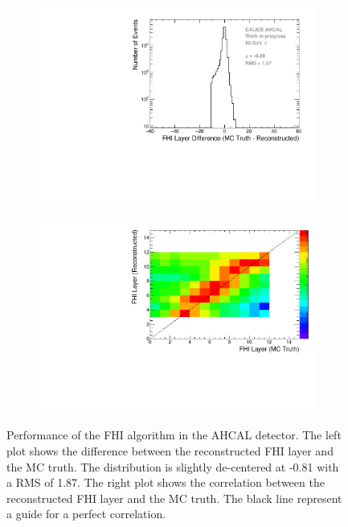 \begin{figure}[htbp!]
	\begin{subfigure}[t]{0.5\textwidth}
		\centering
		\includegraphics[width=1\textwidth]{../Thesis_Plots/Timing/Pions/Plots/ShowerStart_Difference_noOptimisation.pdf}
		\caption{}\label{fig:Diff_FHI_RecoMC}
	\end{subfigure}
	\hfill
	\begin{subfigure}[t]{0.5\textwidth}
		\centering
		\includegraphics[width=1\textwidth]{../Thesis_Plots/Timing/Pions/Plots/ShowerStart_Difference_noOptimisation_2D.pdf}
		\caption{}\label{fig:Corr_FHI_RecoMC}
	\end{subfigure}
	\caption{Performance of the FHI algorithm in the AHCAL detector. The left plot shows the difference between the reconstructed FHI layer and the MC truth. The distribution is slightly de-centered at -0.81 with a RMS of 1.87. The right plot shows the correlation between the reconstructed FHI layer and the MC truth. The black line represent a guide for a perfect correlation.}
	\label{fig:FHIAlgo}
\end{figure}

